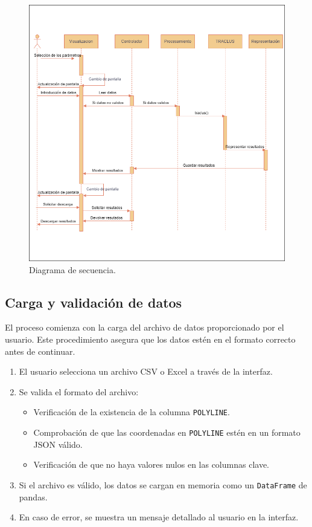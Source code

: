 \begin{figure}[H]
    \centering
    \includegraphics[width=1\textwidth]{img/DiagramaDeSecuencia.png}
    \caption{Diagrama de secuencia.}
\end{figure}

\subsection{Carga y validación de datos}

El proceso comienza con la carga del archivo de datos proporcionado por el usuario. Este procedimiento asegura que los datos estén en el formato correcto antes de continuar.

\begin{enumerate}
    \item El usuario selecciona un archivo CSV o Excel a través de la interfaz.
    \item Se valida el formato del archivo:
    \begin{itemize}
        \item Verificación de la existencia de la columna \texttt{POLYLINE}.
        \item Comprobación de que las coordenadas en \texttt{POLYLINE} estén en un formato JSON válido.
        \item Verificación de que no haya valores nulos en las columnas clave.
    \end{itemize}
    \item Si el archivo es válido, los datos se cargan en memoria como un \texttt{DataFrame} de pandas.
    \item En caso de error, se muestra un mensaje detallado al usuario en la interfaz.
\end{enumerate}

